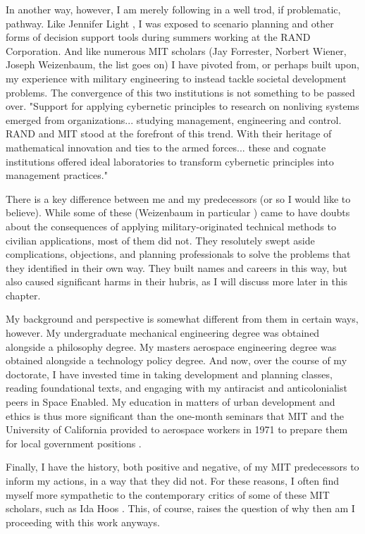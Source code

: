 In another way, however, I am merely following in a well trod, if problematic, pathway. Like Jennifer Light \cite{lightWarfareWelfareDefense2005}, I was exposed to scenario planning and other forms of decision support tools during summers working at the RAND Corporation. And like numerous MIT scholars (Jay Forrester, Norbert Wiener, Joseph Weizenbaum, the list goes on) I have pivoted from, or perhaps built upon, my experience with military engineering to instead tackle societal development problems. The convergence of this two institutions is not something to be passed over. "Support for applying cybernetic principles to research on nonliving systems emerged from organizations... studying management, engineering and control. RAND and MIT stood at the forefront of this trend. With their heritage of mathematical innovation and ties to the armed forces... these and cognate institutions offered ideal laboratories to transform cybernetic principles into management practices." \cite{lightWarfareWelfareDefense2005} 

There is a key difference between me and my predecessors (or so I would like to believe). While some of these  (Weizenbaum in particular \cite{lightWarfareWelfareDefense2005}) came to have doubts about the consequences of applying military-originated technical methods to civilian applications, most of them did not. They resolutely swept aside complications, objections, and planning professionals to solve the problems that they identified in their own way. They built names and careers in this way, but also caused significant harms in their hubris, as I will discuss more later in this chapter.

My background and perspective is somewhat different from them in certain ways, however. My undergraduate mechanical engineering degree was obtained alongside a philosophy degree. My masters aerospace engineering degree was obtained alongside a technology policy degree. And now, over the course of my doctorate, I have invested time in taking development and planning classes, reading foundational texts, and engaging with my antiracist and anticolonialist peers in Space Enabled. My education in matters of urban development and ethics is thus more significant than the one-month seminars that MIT and the University of California provided to aerospace workers in 1971 to prepare them for local government positions \cite{lightWarfareWelfareDefense2005}. 

Finally, I have the history, both positive and negative, of my MIT predecessors to inform my actions, in a way that they did not. For these reasons, I often find myself more sympathetic to the contemporary critics of some of these MIT scholars, such as Ida Hoos \cite{hoosSystemsAnalysisPublic1983}. This, of course, raises the question of why then am I proceeding with this work anyways.	

